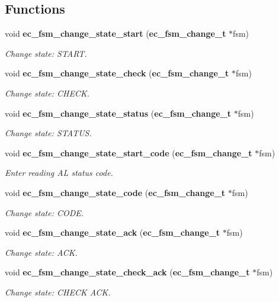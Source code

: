 \subsection*{Functions}
\begin{DoxyCompactItemize}
\item 
void {\bf ec\-\_\-fsm\-\_\-change\-\_\-state\-\_\-start} ({\bf ec\-\_\-fsm\-\_\-change\-\_\-t} $\ast$fsm)
\begin{DoxyCompactList}\small\item\em Change state\-: S\-T\-A\-R\-T. \end{DoxyCompactList}\item 
void {\bf ec\-\_\-fsm\-\_\-change\-\_\-state\-\_\-check} ({\bf ec\-\_\-fsm\-\_\-change\-\_\-t} $\ast$fsm)
\begin{DoxyCompactList}\small\item\em Change state\-: C\-H\-E\-C\-K. \end{DoxyCompactList}\item 
void {\bf ec\-\_\-fsm\-\_\-change\-\_\-state\-\_\-status} ({\bf ec\-\_\-fsm\-\_\-change\-\_\-t} $\ast$fsm)
\begin{DoxyCompactList}\small\item\em Change state\-: S\-T\-A\-T\-U\-S. \end{DoxyCompactList}\item 
void {\bf ec\-\_\-fsm\-\_\-change\-\_\-state\-\_\-start\-\_\-code} ({\bf ec\-\_\-fsm\-\_\-change\-\_\-t} $\ast$fsm)
\begin{DoxyCompactList}\small\item\em Enter reading A\-L status code. \end{DoxyCompactList}\item 
void {\bf ec\-\_\-fsm\-\_\-change\-\_\-state\-\_\-code} ({\bf ec\-\_\-fsm\-\_\-change\-\_\-t} $\ast$fsm)
\begin{DoxyCompactList}\small\item\em Change state\-: C\-O\-D\-E. \end{DoxyCompactList}\item 
void {\bf ec\-\_\-fsm\-\_\-change\-\_\-state\-\_\-ack} ({\bf ec\-\_\-fsm\-\_\-change\-\_\-t} $\ast$fsm)
\begin{DoxyCompactList}\small\item\em Change state\-: A\-C\-K. \end{DoxyCompactList}\item 
void {\bf ec\-\_\-fsm\-\_\-change\-\_\-state\-\_\-check\-\_\-ack} ({\bf ec\-\_\-fsm\-\_\-change\-\_\-t} $\ast$fsm)
\begin{DoxyCompactList}\small\item\em Change state\-: C\-H\-E\-C\-K A\-C\-K. \end{DoxyCompactList}\item 

\end{DoxyCompactItemize}
